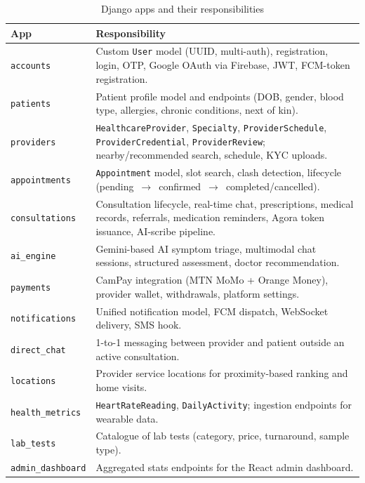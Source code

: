 \begin{table}[H]
\centering
\caption{Django apps and their responsibilities}
\label{tab:backend-apps}
\small
\begin{tabularx}{\textwidth}{|p{3.2cm}|X|}
\hline
\textbf{App} & \textbf{Responsibility} \\ \hline

\texttt{accounts} & Custom \texttt{User} model (UUID, multi-auth), registration, login, OTP, Google OAuth via Firebase, JWT, FCM-token registration. \\ \hline
\texttt{patients} & Patient profile model and endpoints (DOB, gender, blood type, allergies, chronic conditions, next of kin). \\ \hline
\texttt{providers} & \texttt{HealthcareProvider}, \texttt{Specialty}, \texttt{ProviderSchedule}, \texttt{ProviderCredential}, \texttt{ProviderReview}; nearby/recommended search, schedule, KYC uploads. \\ \hline
\texttt{appointments} & \texttt{Appointment} model, slot search, clash detection, lifecycle (pending~$\rightarrow$~confirmed~$\rightarrow$~completed/cancelled). \\ \hline
\texttt{consultations} & Consultation lifecycle, real-time chat, prescriptions, medical records, referrals, medication reminders, Agora token issuance, AI-scribe pipeline. \\ \hline
\texttt{ai\_engine} & Gemini-based AI symptom triage, multimodal chat sessions, structured assessment, doctor recommendation. \\ \hline
\texttt{payments} & CamPay integration (MTN MoMo + Orange Money), provider wallet, withdrawals, platform settings. \\ \hline
\texttt{notifications} & Unified notification model, FCM dispatch, WebSocket delivery, SMS hook. \\ \hline
\texttt{direct\_chat} & 1-to-1 messaging between provider and patient outside an active consultation. \\ \hline
\texttt{locations} & Provider service locations for proximity-based ranking and home visits. \\ \hline
\texttt{health\_metrics} & \texttt{HeartRateReading}, \texttt{DailyActivity}; ingestion endpoints for wearable data. \\ \hline
\texttt{lab\_tests} & Catalogue of lab tests (category, price, turnaround, sample type). \\ \hline
\texttt{admin\_dashboard} & Aggregated stats endpoints for the React admin dashboard. \\ \hline

\end{tabularx}
\end{table}

